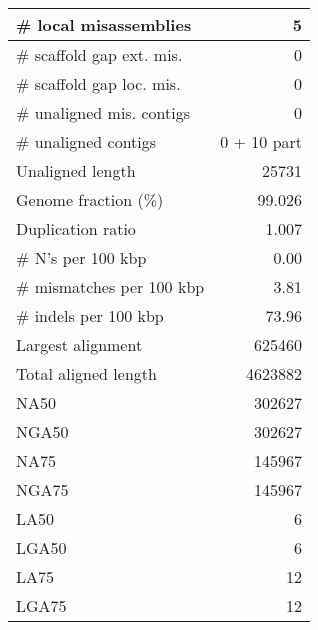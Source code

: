 \documentclass[12pt,a4paper]{article}
\begin{document}
\begin{table}[ht]
\begin{center}
\begin{tabular}{|l*{1}{|r}|}
\# local misassemblies & 5 \\ \hline
\# scaffold gap ext. mis. & 0 \\ \hline
\# scaffold gap loc. mis. & 0 \\ \hline
\# unaligned mis. contigs & 0 \\ \hline
\# unaligned contigs & 0 + 10 part \\ \hline
Unaligned length & 25731 \\ \hline
Genome fraction (\%) & 99.026 \\ \hline
Duplication ratio & 1.007 \\ \hline
\# N's per 100 kbp & 0.00 \\ \hline
\# mismatches per 100 kbp & 3.81 \\ \hline
\# indels per 100 kbp & 73.96 \\ \hline
Largest alignment & 625460 \\ \hline
Total aligned length & 4623882 \\ \hline
NA50 & 302627 \\ \hline
NGA50 & 302627 \\ \hline
NA75 & 145967 \\ \hline
NGA75 & 145967 \\ \hline
LA50 & 6 \\ \hline
LGA50 & 6 \\ \hline
LA75 & 12 \\ \hline
LGA75 & 12 \\ \hline
\end{tabular}
\end{center}
\end{table}
\end{document}
